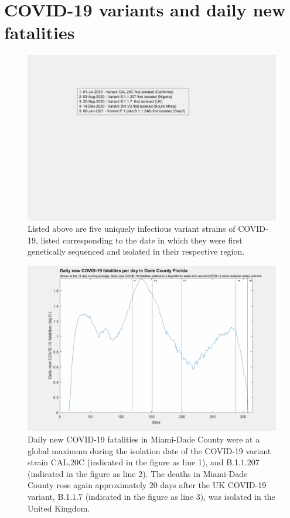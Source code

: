 \documentclass[]{article}
\begin{document}
\indent 

 
\FloatBarrier
\vspace{5mm}
\section*{COVID-19 variants and daily new fatalities}


\begin{figure}[!h]
	\includegraphics[width=\linewidth]{legends/variant_strains_legend.png}
	\caption{Listed above are five uniquely infectious variant strains of COVID-19,  listed corresponding to the date in which they were first genetically sequenced and isolated in their respective region.}
	\label{fig:legends/variant_strains_legendLabel}
\end{figure}

\begin{figure}[!h]
	\includegraphics[width=\linewidth]{images/dade_fatalities_strains_log.png}
	\caption{Daily new COVID-19 fatalities in Miami-Dade County were at a global maximum during the isolation date of the COVID-19 variant strain CAL.20C (indicated in the figure as line 1), and B.1.1.207 (indicated in the figure as line 2). The deaths in Miami-Dade County rose again approximately 20 days after the UK COVID-19 variant, B.1.1.7 (indicated in the figure as line 3), was isolated in the United Kingdom.   }
	\label{fig:images/dade_fatalities_strains_logLabel}
\end{figure}
\end{document}
